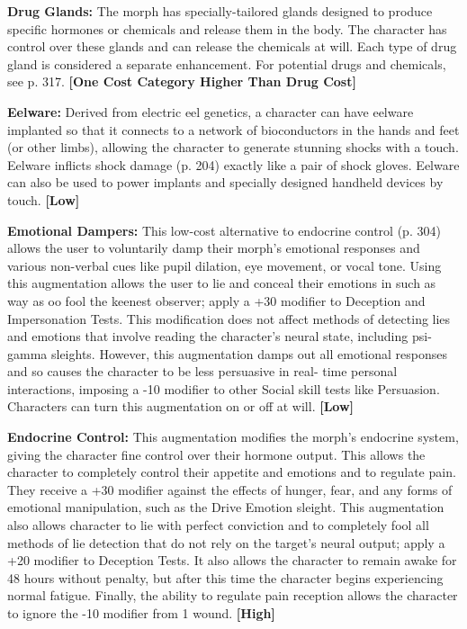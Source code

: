 \textbf{Drug Glands:} The morph has specially-tailored glands designed to produce specific hormones or chemicals and release them in the body. The character has control over these glands and can release the chemicals at will. Each type of drug gland is considered a separate enhancement. For potential drugs and chemicals, see p. 317. \textbf{[One Cost Category Higher Than Drug Cost]} 

\textbf{Eelware:} Derived from electric eel genetics, a character can have eelware implanted so that it connects to a network of bioconductors in the hands and feet (or other limbs), allowing the character to generate stunning shocks with a touch. Eelware inflicts shock damage (p. 204) exactly like a pair of shock gloves. Eelware can also be used to power implants and specially designed handheld devices by touch. \textbf{[Low]} 

\textbf{Emotional Dampers:} This low-cost alternative to endocrine control (p. 304) allows the user to voluntarily damp their morph’s emotional responses and various non-verbal cues like pupil dilation, eye movement, or vocal tone. Using this augmentation allows the user to lie and conceal their emotions in such as way as oo fool the keenest observer; apply a +30 modifier to Deception and Impersonation Tests. This modification does not affect methods of detecting lies and emotions that involve reading the character’s neural state, including psi-gamma sleights. However, this augmentation damps out all emotional responses and so causes the character to be less persuasive in real- time personal interactions, imposing a -10 modifier to other Social skill tests like Persuasion. Characters can turn this augmentation on or off at will. \textbf{[Low]} 

\textbf{Endocrine Control:} This augmentation modifies the morph’s endocrine system, giving the character fine control over their hormone output. This allows the character to completely control their appetite and emotions and to regulate pain. They receive a +30 modifier against the effects of hunger, fear, and any forms of emotional manipulation, such as the Drive Emotion sleight. This augmentation also allows character to lie with perfect conviction and to completely fool all methods of lie detection that do not rely on the target’s neural output; apply a +20 modifier to Deception Tests. It also allows the character to remain awake for 48 hours without penalty, but after this time the character begins experiencing normal fatigue. Finally, the ability to regulate pain reception allows the character to ignore the -10 modifier from 1 wound. \textbf{[High]} 

